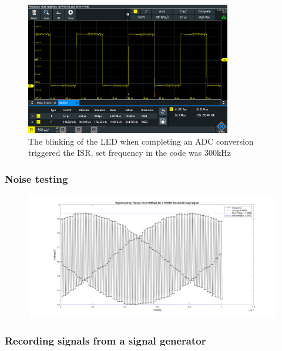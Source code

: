 \begin{figure}[h]
    \centering
    \includegraphics[width=0.8\textwidth]{graphics/STATDMA_300.PNG}
    \caption{The blinking of the LED when completing an ADC conversion triggered the ISR, set frequency in the code was 300kHz}
    \label{fig:PDBADCDMAsp300}
\end{figure}





\subsubsection{Noise testing}

\begin{figure}[h]
    \centering
    \includegraphics[width=1.0\textwidth]{graphics/100khzMatlab.png}
    \caption{}
    \label{fig:100kmatlab}
\end{figure}






\subsubsection{Recording signals from a signal generator}

